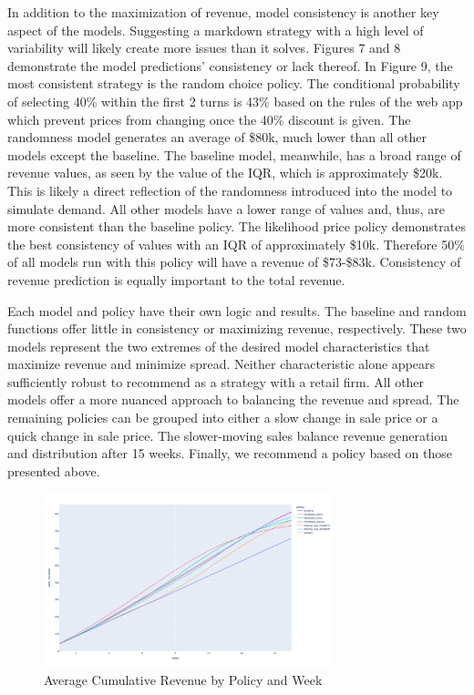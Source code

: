 \documentclass[11pt,a4paper]{article}
\begin{document}
In addition to the maximization of revenue, model consistency is another key aspect of the models. 
Suggesting a markdown strategy with a high level of variability will likely create more issues than it solves.  
Figures 7 and 8 demonstrate the model predictions’ consistency or lack thereof.  
In Figure 9, the most consistent strategy is the random choice policy. 
The conditional probability of selecting 40\% within the first 2 turns is 43\% based on the rules of the web app which prevent prices from changing once the 40\% discount is given. 
The randomness model generates an average of \$80k, much lower than all other models except the baseline. 
The baseline model, meanwhile, has a broad range of revenue values, as seen by the value of the IQR, which is approximately \$20k. 
This is likely a direct reflection of the randomness introduced into the model to simulate demand. 
All other models have a lower range of values and, thus, are more consistent than the baseline policy. 
The likelihood price policy demonstrates the best consistency of values with an IQR of approximately \$10k. 
Therefore 50\% of all models run with this policy will have a revenue of \$73-\$83k.  
Consistency of revenue prediction is equally important to the total revenue.

Each model and policy have their own logic and results. 
The baseline and random functions offer little in consistency or maximizing revenue, respectively. 
These two models represent the two extremes of the desired model characteristics that maximize revenue and minimize spread. 
Neither characteristic alone appears sufficiently robust to recommend as a strategy with a retail firm. 
All other models offer a more nuanced approach to balancing the revenue and spread. 
The remaining policies can be grouped into either a slow change in sale price or a quick change in sale price. 
The slower-moving sales balance revenue generation and distribution after 15 weeks. 
Finally, we recommend a policy based on those presented above.\\

\begin{figure}[h]
    \centering
    \includegraphics[width=0.75\textwidth]{pic/f5.png}
    \caption{Average Cumulative Revenue by Policy and Week}
\end{figure}
\end{document}
